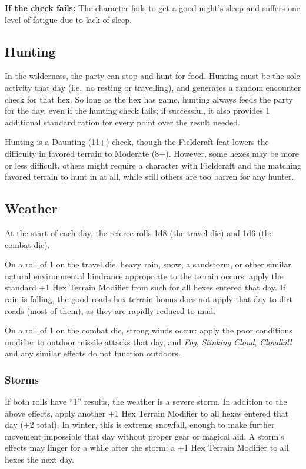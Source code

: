 \documentclass{article}
\begin{document}
\begin{multicols}{2}
\textbf{If the check fails:} The character fails to get a good night's
sleep and suffers one level of fatigue due to lack of sleep.

\subsection{Hunting}\label{hunting}

In the wilderness, the party can stop and hunt for food. Hunting must be
the sole activity that day (i.e.~no resting or travelling), and
generates a random encounter check for that hex. So long as the hex has
game, hunting always feeds the party for the day, even if the hunting
check fails; if successful, it also provides 1 additional standard
ration for every point over the result needed.

Hunting is a Daunting (11+) check, though the Fieldcraft feat lowers the
difficulty in favored terrain to Moderate (8+). However, some hexes may
be more or less difficult, others might require a character with
Fieldcraft and the matching favored terrain to hunt in at all, while
still others are too barren for any hunter.

\subsection{Weather}\label{weather}

At the start of each day, the referee rolls 1d8 (the travel die) and 1d6
(the combat die).

On a roll of 1 on the travel die, heavy rain, snow, a sandstorm, or
other similar natural environmental hindrance appropriate to the terrain
occurs: apply the standard +1 Hex Terrain Modifier from such for all
hexes entered that day. If rain is falling, the good roads hex terrain
bonus does not apply that day to dirt roads (most of them), as they are
rapidly reduced to mud.

On a roll of 1 on the combat die, strong winds occur: apply the poor
conditions modifier to outdoor missile attacks that day, and \emph{Fog},
\emph{Stinking Cloud}, \emph{Cloudkill} and any similar effects do not
function outdoors.

\subsubsection{Storms}\label{storms}

If both rolls have ``1'' results, the weather is a severe storm. In
addition to the above effects, apply another +1 Hex Terrain Modifier to
all hexes entered that day (+2 total). In winter, this is extreme
snowfall, enough to make further movement impossible that day without
proper gear or magical aid. A storm's effects may linger for a while
after the storm: a +1 Hex Terrain Modifier to all hexes the next day.


\end{multicols}
\end{document}
